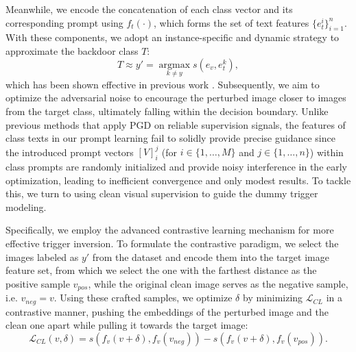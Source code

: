 Meanwhile, we encode the concatenation of each class vector and its corresponding prompt using $f_t(\cdot)$, which forms the set of text features $\{e_t^i\}_{i=1}^n$. With these components, we adopt an instance-specific and dynamic strategy to approximate the backdoor class $T$:
\begin{equation}
    T \approx y'=\mathop{\arg\max}\limits_{k\neq y} {s(e_v, e_t^k)},
    \label{eq:backdoor_class}
\end{equation}
which has been shown effective in previous work \cite{zhu2024neural}. Subsequently, we aim to optimize the adversarial noise to encourage the perturbed image closer to images from the target class, ultimately falling within the decision boundary. 
Unlike previous methods that apply PGD \cite{madry2017towards} on reliable supervision signals, the features of class texts in our prompt learning fail to solidly provide precise guidance since the introduced prompt vectors $[V]_i^j$ (for $i \in \{1,\ldots, M\}$ and $j \in \{1, \ldots, n\}$) within class prompts are randomly initialized and provide noisy interference in the early optimization, leading to inefficient convergence and only modest results. To tackle this, we turn to using clean visual supervision to guide the dummy trigger modeling.

Specifically, we employ the advanced contrastive learning mechanism for more effective trigger inversion. To formulate the contrastive paradigm, we select the images labeled as $y'$ from the dataset and encode them into the target image feature set, from which we select the one with the farthest distance as the positive sample $v_{pos}$, while the original clean image serves as the negative sample, i.e. $v_{neg}=v$. Using these crafted samples, we optimize $\delta$ by minimizing $\mathcal{L}_{CL}$ in a contrastive manner, pushing the embeddings of the perturbed image and the clean one apart while pulling it towards the target image:
\begin{equation}
    \mathcal{L}_{CL}(v, \delta)=s(f_v(v+\delta), f_v(v_{neg}))-s(f_v(v+\delta), f_v(v_{pos})).
    \label{eq:loss_CL}
\end{equation}

